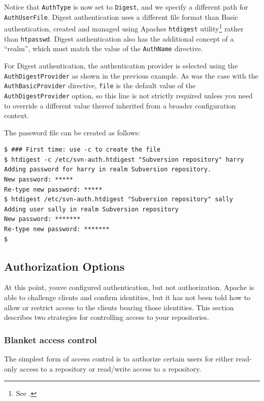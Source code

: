 Notice that \texttt{AuthType} is now set to \texttt{Digest}, and we
specify a different path for \texttt{AuthUserFile}. Digest
authentication uses a different file format than Basic authentication,
created and managed using Apache\textquotesingle s \texttt{htdigest}
utility\footnote{See
  \href{https://httpd.apache.org/docs/current/programs/htdigest.html}{}.}
rather than \texttt{htpasswd}. Digest authentication also has the
additional concept of a ``realm'', which must match the value of the
\texttt{AuthName} directive.

For Digest authentication, the authentication provider is selected using
the \texttt{AuthDigestProvider} as shown in the previous example. As was
the case with the \texttt{AuthBasicProvider} directive, \texttt{file} is
the default value of the \texttt{AuthDigestProvider} option, so this
line is not strictly required unless you need to override a different
value thereof inherited from a broader configuration context.

The password file can be created as follows:

\begin{verbatim}
$ ### First time: use -c to create the file
$ htdigest -c /etc/svn-auth.htdigest "Subversion repository" harry
Adding password for harry in realm Subversion repository.
New password: *****
Re-type new password: *****
$ htdigest /etc/svn-auth.htdigest "Subversion repository" sally
Adding user sally in realm Subversion repository
New password: *******
Re-type new password: *******
$
\end{verbatim}

\subsection{Authorization Options}\label{svn.serverconfig.httpd.authz}

At this point, you\textquotesingle ve configured authentication, but not
authorization. Apache is able to challenge clients and confirm
identities, but it has not been told how to allow or restrict access to
the clients bearing those identities. This section describes two
strategies for controlling access to your repositories.

\subsubsection{Blanket access
control}\label{svn.serverconfig.httpd.authz.blanket}

The simplest form of access control is to authorize certain users for
either read-only access to a repository or read/write access to a
repository.

